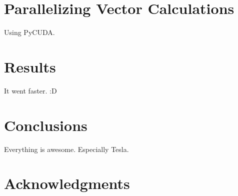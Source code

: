 \documentclass[12pt]{article}
\begin{document}
\section{Parallelizing Vector Calculations}

Using PyCUDA. %

\section{Results}

It went faster. :D %


\section{Conclusions}
Everything is awesome. Especially Tesla.

\section{Acknowledgments}

\end{document}
